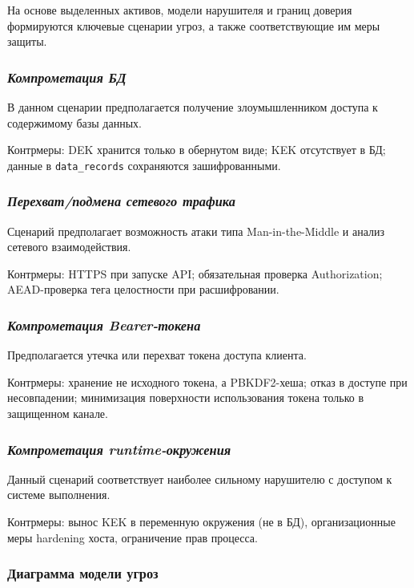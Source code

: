 \documentclass[14pt, a4paper]{extarticle}
\begin{document}
	На основе выделенных активов, модели нарушителя и границ доверия формируются ключевые сценарии угроз, а также соответствующие им меры защиты.
	
	\subsubsection*{\textit{Компрометация БД}}
	
	В данном сценарии предполагается получение злоумышленником доступа к содержимому базы данных.
	
	Контрмеры: DEK хранится только в обернутом виде; KEK отсутствует в БД; данные в \texttt{data\_records} сохраняются зашифрованными.
	
	\subsubsection*{\textit{Перехват/подмена сетевого трафика}}
	
	Сценарий предполагает возможность атаки типа Man-in-the-Middle и анализ сетевого взаимодействия.
	
	Контрмеры: HTTPS при запуске API; обязательная проверка Authorization; AEAD-проверка тега целостности при расшифровании.
	
	\subsubsection*{\textit{Компрометация Bearer-токена}}
	
	Предполагается утечка или перехват токена доступа клиента.
	
	Контрмеры: хранение не исходного токена, а PBKDF2-хеша; отказ в доступе при несовпадении; минимизация поверхности использования токена только в защищенном канале.
	
	\subsubsection*{\textit{Компрометация runtime-окружения}}
	
	Данный сценарий соответствует наиболее сильному нарушителю с доступом к системе выполнения.
	
	Контрмеры: вынос KEK в переменную окружения (не в БД), организационные меры hardening хоста, ограничение прав процесса. 
	
	\subsubsection{Диаграмма модели угроз}
	
\end{document}
